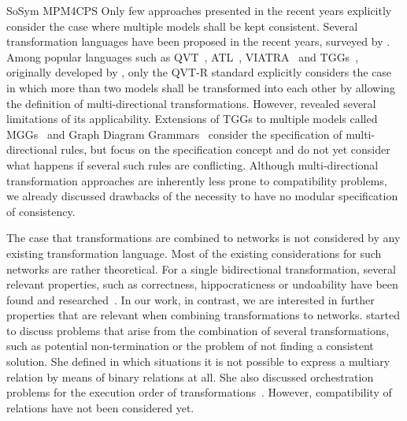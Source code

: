 \begin{copiedFrom}{SoSym MPM4CPS}
Only few approaches presented in the recent years explicitly consider the case where multiple models shall be kept consistent.
Several transformation languages have been proposed in the recent years, surveyed by \textcite{etzlstorfer2013SurveyIncrementalTransformation-ME}.
Among popular languages such as QVT~\cite{qvt}, \gls{ATL}~\cite{jouault2006a,xiong2007a}, VIATRA~\cite{bergmann2015viatra} and \glspl{TGG}~\cite{anjorin2014b,anjorin2014c}, originally developed by \textcite{schuerr1995a}, only the QVT-R standard explicitly considers the case in which more than two models shall be transformed into each other by allowing the definition of multi-directional transformations.
However, \textcite{macedo2014FrameworkMultiDirectional-BX} revealed several limitations of its applicability.
Extensions of \glspl{TGG} to multiple models called \glspl{MGG}~\cite{konigs2006sosym} and Graph Diagram Grammars~\cite{trollmann2015TransformationTGGtoMultiModel-ICMT, trollmann2016SynchronizationTGGtoMultiModel-ICMT} consider the specification of multi-directional rules, but focus on the specification concept and do not yet consider what happens if several such rules are conflicting.
Although multi-directional transformation approaches are inherently less prone to compatibility problems, we already discussed drawbacks of the necessity to have no modular specification of consistency.

The case that transformations are combined to networks is not considered by any existing transformation language.
Most of the existing considerations for such networks are rather theoretical.
For a single bidirectional transformation, several relevant properties, such as correctness, hippocraticness or undoability have been found and researched~\cite{stevens2010sosym}.
In our work, in contrast, we are interested in further properties that are relevant when combining transformations to networks.
\textcite{stevens2020BidirectionalTransformationLarge-SoSym} started to discuss problems that arise from the combination of several transformations, such as potential non-termination or the problem of not finding a consistent solution. She defined in which situations it is not possible to express a multiary relation by means of binary relations at all.
She also discussed orchestration problems for the execution order of transformations~\cite{stevens2020BuildingFromMegamodels-SoSym}.
However, compatibility of relations %
have not been considered yet.


\end{copiedFrom}
